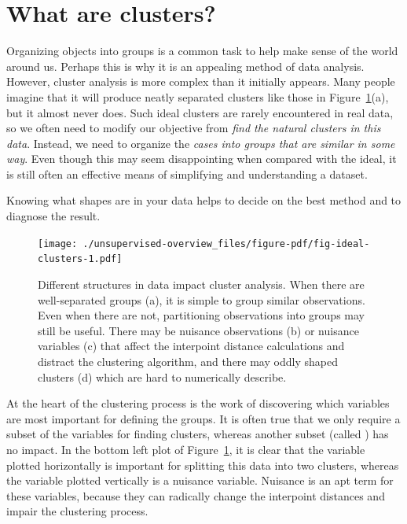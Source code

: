 \documentclass[
  letterpaper,
]{book}
\begin{document}
\hypertarget{what-are-clusters}{%
\section{What are clusters?}\label{what-are-clusters}}

Organizing objects into groups is a common task to help make sense of
the world around us. Perhaps this is why it is an appealing method of
data analysis. However, cluster analysis is more complex than it
initially appears. Many people imagine that it will produce neatly
separated clusters like those in Figure~\ref{fig-ideal-clusters}(a), but
it almost never does. Such ideal clusters are rarely encountered in real
data, so we often need to modify our objective from \emph{find the
natural clusters in this data}. Instead, we need to organize the
\emph{cases into groups that are similar in some way}. Even though this
may seem disappointing when compared with the ideal, it is still often
an effective means of simplifying and understanding a dataset.

Knowing what shapes are in your data helps to decide on the best method
and to diagnose the result.

\begin{figure}

{\centering \texttt{[image: ./unsupervised-overview\_files/figure-pdf/fig-ideal-clusters-1.pdf]}

}

\caption{\label{fig-ideal-clusters}Different structures in data impact
cluster analysis. When there are well-separated groups (a), it is simple
to group similar observations. Even when there are not, partitioning
observations into groups may still be useful. There may be nuisance
observations (b) or nuisance variables (c) that affect the interpoint
distance calculations and distract the clustering algorithm, and there
may oddly shaped clusters (d) which are hard to numerically describe.}

\end{figure}

At the heart of the clustering process is the work of discovering which
variables are most important for defining the groups. It is often true
that we only require a subset of the variables for finding clusters,
whereas another subset (called ) has no impact.
In the bottom left plot of Figure~\ref{fig-ideal-clusters}, it is clear
that the variable plotted horizontally is important for splitting this
data into two clusters, whereas the variable plotted vertically is a
nuisance variable. Nuisance is an apt term for these variables, because
they can radically change the interpoint distances and impair the
clustering process. 
\end{document}

